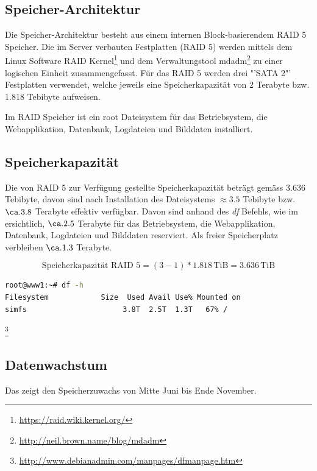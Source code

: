 \subsection{Speicher-Architektur}
Die Speicher-Architektur besteht aus einem internen Block-basierendem RAID 5 Speicher. Die im Server verbauten Festplatten (RAID 5) werden mittels dem Linux Software RAID Kernel\footnote{\url{https://raid.wiki.kernel.org/}} und dem Verwaltungstool mdadm\footnote{\url{http://neil.brown.name/blog/mdadm}} zu einer logischen Einheit zusammengefasst. Für das RAID 5 werden drei  "'SATA 2"' Festplatten verwendet, welche jeweils eine Speicherkapazität von 2 Terabyte bzw. 1.818 Tebibyte aufweisen.

Im RAID Speicher ist ein root Dateisystem für das Betriebsystem, die Webapplikation, Datenbank, Logdateien und Bilddaten installiert.

\subsection{Speicherkapazität}
Die von RAID 5 zur Verfügung gestellte Speicherkapazität beträgt gemäss  3.636 Tebibyte, davon sind nach Installation des Dateisystems $\approx 3.5$ Tebibyte bzw. $\ca. 3.8 $ Terabyte effektiv verfügbar. Davon sind anhand des \textit{df} Befehls,  wie im ersichtlich, $\ca. 2.5$ Terabyte für das Betriebsystem, die Webapplikation, Datenbank, Logdateien und Bilddaten reserviert. Als freier Speicherplatz verbleiben $\ca. 1.3$ Terabyte.

\begin{equation}
\mbox{Speicherkapazität RAID 5}= (3 - 1) * 1.818  \, \mathrm{TiB} =  3.636 \, \mathrm{TiB}
\label{eqn:RAID 5-3disk}
\end{equation}

\begin{lstlisting}[label=df, language=Bash, caption=Report Dateisystem Speicherplatz Belegung in Dezimal Prefix ]
root@www1:~# df -h
Filesystem            Size  Used Avail Use% Mounted on
simfs                      3.8T  2.5T  1.3T   67% /
\end{lstlisting}
\footnote{\url{http://www.debianadmin.com/manpages/dfmanpage.htm}}

\subsection{Datenwachstum}
Das  zeigt den Speicherzuwachs von Mitte Juni bis Ende November.

